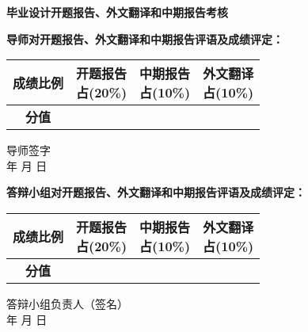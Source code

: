 \thispagestyle{empty}
\begin{center}
\stfangsong\sanhao \textbf{毕业设计开题报告、外文翻译和中期报告考核}
\end{center}
{\songti\sihao \textbf{导师对开题报告、外文翻译和中期报告评语及成绩评定：}}

\vspace{1cm}

\vspace{2cm}

{
\hspace{3cm} \songti\xiaosi
\begin{tabular}{|c|c|c|c|}
    \hline
    \textbf{成绩比例} & \parbox[t]{4em}{开题报告\\[-1.5em]占(20\%)} &
               \parbox[t]{4em}{中期报告\\[-1.5em]占(10\%)} &
               \parbox[t]{4em}{外文翻译\\[-1.5em]占(10\%)} \\

    \hline
    \textbf{分值}   & & & \\
    \hline
\end{tabular}
}
\begin{flushright}
    导师签字\;\underline{\hspace{4em}}\\
    年 \quad 月 \quad 日
\end{flushright}

\vspace{1cm}
{\songti\sihao \textbf{答辩小组对开题报告、外文翻译和中期报告评语及成绩评定：}}
\vspace{5cm}

{
\hspace{3cm} \songti\xiaosi
\begin{tabular}{|c|c|c|c|}
    \hline
    \textbf{成绩比例} & \parbox[t]{4em}{开题报告\\[-1.5em]占(20\%)} &
               \parbox[t]{4em}{中期报告\\[-1.5em]占(10\%)} &
               \parbox[t]{4em}{外文翻译\\[-1.5em]占(10\%)} \\

    \hline
    \textbf{分值}   & & &  \\
    \hline
\end{tabular}
}
\begin{flushright}
    答辩小组负责人（签名）\;\underline{\hspace{4em}}\\
    年 \quad 月 \quad 日
\end{flushright}


